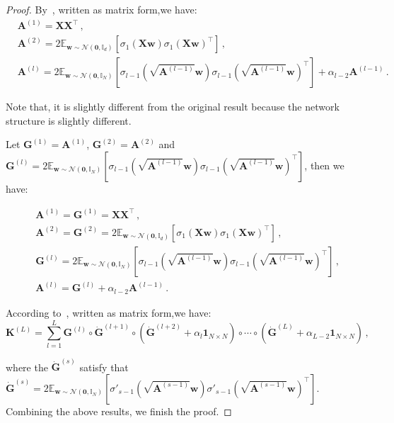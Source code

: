 \documentclass[nohyperref]{article}
\theoremstyle{plain}
\theoremstyle{definition}
\theoremstyle{remark}
\begin{document}
\begin{proof}
By~\citet[Proposition 3]{huang2020deep}, written as matrix form,we have:
\begin{equation*}
\begin{split}
    &\bm{A}^{(1)}=\bm{XX}^\top\,,\\
    &\bm{A}^{(2)}=2\mathbb{E}_{\bm{w} \sim \mathcal N(\bm 0,\mathbb{I}_{d})}[\sigma_1(\bm{Xw})\sigma_1(\bm{Xw})^\top]\,,\\
    &\bm{A}^{(l)}=2\mathbb{E}_{\bm{w} \sim \mathcal N(\bm 0,\mathbb{I}_{N})}[\sigma_{l-1}(\sqrt{\bm{A}^{(l-1)}} \bm{w})\sigma_{l-1}(\sqrt{\bm{A}^{(l-1)}} \bm{w})^\top]+\alpha_{l-2}\bm{A}^{(l-1)}\,.
\end{split}
\end{equation*}

Note that, it is slightly different from the original result because the network structure is slightly different.

Let $\bm{G}^{(1)}=\bm{A}^{(1)}$, $\bm{G}^{(2)}=\bm{A}^{(2)}$ and $\bm{G}^{(l)}=2\mathbb{E}_{\bm{w} \sim \mathcal N(\bm 0,\mathbb{I}_{N})}[\sigma_{l-1}(\sqrt{\bm{A}^{(l-1)}} \bm{w})\sigma_{l-1}(\sqrt{\bm{A}^{(l-1)}} \bm{w})^\top]$, then we have:

\begin{equation*}
    \begin{split}
        & \bm{A}^{(1)}=\bm{G}^{(1)}=\bm{XX}^\top\,,\\
        & \bm{A}^{(2)} = \bm{G}^{(2)}=2\mathbb{E}_{\bm{w} \sim \mathcal N(\bm 0,\mathbb{I}_{d})}[\sigma_1(\bm{Xw})\sigma_1(\bm{Xw})^\top]\,,\\
        & \bm{G}^{(l)}=2\mathbb{E}_{\bm{w} \sim \mathcal N(\bm 0,\mathbb{I}_{N})}[\sigma_{l-1}(\sqrt{\bm{A}^{(l-1)}} \bm{w})\sigma_{l-1}(\sqrt{\bm{A}^{(l-1)}} \bm{w})^\top]\,,\\
        & \bm{A}^{(l)}=\bm{G}^{(l)}+\alpha_{l-2}\bm{A}^{(l-1)}\,.    
    \end{split}
\end{equation*}

According to~\citet[Proposition 4]{huang2020deep}, written as matrix form,we have:
\begin{equation*}
    \bm{K}^{(L)}=\sum_{l=1}^{L}\bm{G}^{(l)}\circ \dot{\bm{G}}^{(l+1)} \circ (\dot{\bm{G}}^{(l+2)}+  \alpha_{l}\bm{1}_{N \times N})\circ \cdots \circ (\dot{\bm{G}}^{(L)}+ \alpha_{L-2}\bm{1}_{N \times N})\,,
\end{equation*}

where the $\dot{\bm{G}}^{(s)}$ satisfy that $\dot{\bm{G}}^{(s)} = 2\mathbb{E}_{\bm{w} \sim \mathcal N(\bm{0},\mathbb{I}_{N})}[{\sigma}'_{s-1}(\sqrt{\bm{A}^{(s-1)}} \bm{w}){\sigma}'_{s-1}(\sqrt{\bm{A}^{(s-1)}} \bm{w})^\top]$. Combining the above results, we finish the proof.

\end{proof}
\end{document}

